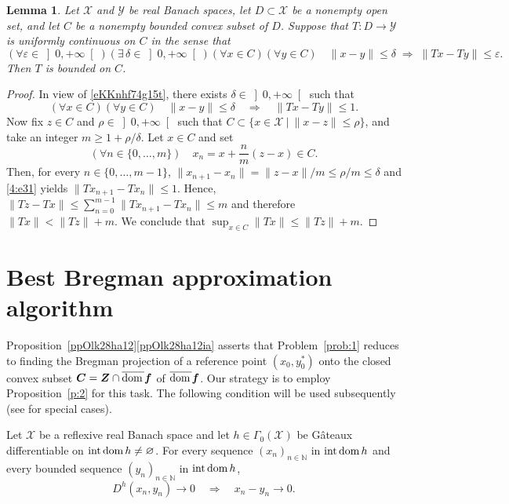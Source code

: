\documentclass[a4paper,11pt,fleqn]{article}
\renewcommand{\leq}{\ensuremath{\leqslant}}
\renewcommand{\geq}{\ensuremath{\geqslant}}
\newcommand{\menge}[2]{\big\{{#1}~\big |~{#2}\big\}}
\newcommand{\XX}{\ensuremath{{\mathcal X}}}
\newcommand{\YY}{\ensuremath{{\mathcal Y}}}
\newcommand{\emp}{\ensuremath{{\varnothing}}}
\newcommand{\RPP}{\ensuremath{\left]0,+\infty\right[}}
\newcommand{\NN}{\ensuremath{\mathbb N}}
\newcommand{\exi}{\ensuremath{\exists\,}}
\newcommand{\dom}{\ensuremath{\text{\rm dom}\,}}
\newcommand{\intdom}{\ensuremath{\text{\rm int\,dom}\,}}
\newtheorem{lemma}[theorem]{Lemma}
\theoremstyle{plain}{\theorembodyfont{\rmfamily}%
\newtheorem{conjecture}[theorem]{Conjecture}}
\theoremstyle{plain}{\theorembodyfont{\rmfamily}%
\newtheorem{example}[theorem]{Example}}
\theoremstyle{plain}{\theorembodyfont{\rmfamily}%
\newtheorem{remark}[theorem]{Remark}}
\theoremstyle{plain}{\theorembodyfont{\rmfamily}%
\newtheorem{algorithm}[theorem]{Algorithm}}
\theoremstyle{plain}{\theorembodyfont{\rmfamily}%
\newtheorem{condition}[theorem]{Condition}}
\theoremstyle{plain}{\theorembodyfont{\rmfamily}%
\newtheorem{definition}[theorem]{Definition}}
\theoremstyle{plain}{\theorembodyfont{\rmfamily}
\newtheorem{problem}[theorem]{Problem}}
\theoremstyle{plain}{\theorembodyfont{\rmfamily}
\newtheorem{notation}[theorem]{Notation}}
\numberwithin{equation}{section}
\begin{document}
\begin{lemma}
\label{IVlKKnhf74g10}
Let $\XX$ and $\YY$ be real Banach spaces, let $D\subset\XX$
be a nonempty open set, and let $C$ be a nonempty bounded convex 
subset of $D$. Suppose that $T\colon D\to\YY$ is uniformly 
continuous on $C$ in the sense that 
\begin{equation}
\label{eKKnhf74g15t}
(\forall\varepsilon\in\RPP)(\exi\delta\in\RPP)(\forall x\in C)
(\forall y\in C)\quad
\|x-y\|\leq\delta\;\Rightarrow\;
\|Tx-Ty\|\leq\varepsilon.
\end{equation}
Then $T$ is bounded on $C$.
\end{lemma}
\begin{proof}
In view of \eqref{eKKnhf74g15t}, there exists
$\delta\in\RPP$ such that
\begin{equation}
\label{4:e31}
(\forall x\in C)(\forall y\in C)\quad 
\|x-y\|\leq\delta\quad\Rightarrow\quad\|Tx-Ty\|\leq 1.
\end{equation}
Now fix $z\in C$ and $\rho\in\RPP$ such that 
$C\subset\menge{x\in\XX}{\|x-z\|\leq\rho}$, and take
an integer $m\geq 1+\rho/\delta$. 
Let $x\in C$ and set 
\begin{equation}
(\forall n\in\{0,\ldots,m\})\quad  
x_n=x+\dfrac{n}{m}(z-x)\in C.
\end{equation}
Then, for every $n\in\{0,\ldots,m-1\}$,
$\|x_{n+1}-x_n\|=\|z-x\|/m\leq\rho/m\leq\delta$ and
\eqref{4:e31} yields $\|Tx_{n+1}-Tx_n\|\leq 1$. Hence,
$\|Tz-Tx\|\leq\sum_{n=0}^{m-1}\|Tx_{n+1}-Tx_n\|\leq m$ and
therefore $\|Tx\|<\|Tz\|+m$. We conclude that 
$\sup_{x\in C}\|Tx\|\leq\|Tz\|+m$.
\end{proof}

\section{Best Bregman approximation algorithm}
\label{IVsec:V}
Proposition~\ref{ppOlk28ha12}\ref{ppOlk28ha12ia} asserts that 
Problem~\ref{prob:1} reduces to finding the Bregman projection 
of a reference point $(x_0,y_0^*)$ onto the closed convex subset
$\boldsymbol{C}=\boldsymbol{Z}\cap\overline{\dom}\boldsymbol{f}$
of $\overline{\dom}\boldsymbol{f}$. Our strategy is to employ 
Proposition~\ref{p:2} for this task.
The following condition will be used subsequently
(see \cite[Examples~4.10, 5.11, and 5.13]{Sico03} for special cases).

\begin{condition}
{\rm\cite[Condition~4.3(ii)]{Pams03}}
\label{IVC:1}
Let $\XX$ be a reflexive real Banach space and let
$h\in\Gamma_0(\XX)$ be G\^ateaux differentiable on 
$\intdom h\neq\emp$. For every sequence 
$(x_n)_{n\in\NN}$ in $\intdom h$ and every bounded sequence 
$(y_n)_{n\in\NN}$ in $\intdom h$, 
\begin{equation}
\label{IVbcn5y713b}
D^h(x_n,y_n)\to 0\quad\Rightarrow\quad x_n-y_n\to 0.
\end{equation}
\end{condition}
\end{document}
